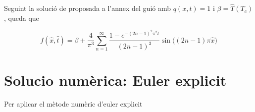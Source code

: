 \documentclass[11pt]{article}
\begin{document}
Seguint la solució de proposada a l'annex del guió amb $q(x,t)=1$ i $\beta=\hat{T}(T_c)$, queda que



\begin{equation}
    f(\hat{x}, \hat{t}) = \beta + \frac{4}{\pi^3} \sum_{n=1}^{\infty} \frac{1 - e^{-(2n-1)^2 \pi^2 \hat{t}}}{(2n-1)^3} \sin\big((2n-1)\pi \hat{x})
\label{eq: analitica}
\end{equation}


\section{Solucio numèrica: Euler explicit}

Per aplicar el mètode numèric d'euler explicit
\end{document}
